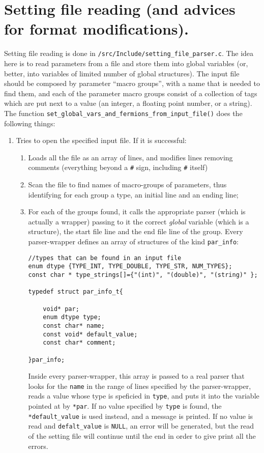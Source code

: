 \section{Setting file reading (and advices for format modifications).}
Setting file reading is done in \verb|/src/Include/setting_file_parser.c|. The idea here is to 
read parameters from a file and store them into global variables (or, better, 
into variables of limited number of global structures). The input file should 
be composed by parameter ``macro groups'', with a name that is needed to find 
them, and each of the parameter macro groups consist of a collection of tags 
which are put next to a value (an integer, a floating point number, or a 
string). The function 
\verb|set_global_vars_and_fermions_from_input_file()| does the 
following things:
\begin{enumerate}
    \item Tries to open the specified input file. If it is successful:
        \begin{enumerate}
            \item Loads all the file as an array of lines, and modifies lines removing 
                comments (everything beyond a \verb|#| sign, including \verb|#| itself)
            \item Scan the file to find names of macro-groups of parameters, thus 
                identifying for each group a type, an initial line and an ending line;
            \item For each of the groups found, it calls the appropriate parser (which 
                is actually a wrapper) passing to it the correct \emph{global} variable (which is a structure), 
                the start file line and the end file line of the group. Every parser-wrapper 
                defines an array of structures of the kind \verb|par_info|:
\begin{verbatim}
//types that can be found in an input file
enum dtype {TYPE_INT, TYPE_DOUBLE, TYPE_STR, NUM_TYPES};
const char * type_strings[]={"(int)", "(double)", "(string)" };

typedef struct par_info_t{

    void* par;
    enum dtype type;
    const char* name;
    const void* default_value;
    const char* comment;

}par_info;
\end{verbatim}
                Inside every parser-wrapper, this array is passed to a real parser that looks 
                for the \verb|name| in the range of lines specified by the parser-wrapper, 
                reads a value whose type is speficied in \verb|type|, and puts it into the 
                variable pointed at by \verb|*par|. If no value specified by \verb|type| is 
                found, the \verb|*default_value| is used instead, and a message is printed.
                If no value is read and  \verb|defalt_value| is \verb|NULL|, an error will be generated,
                but the read of the setting file will continue until the end in order to 
                give print all the errors.
                

\end{enumerate}
\end{enumerate}

